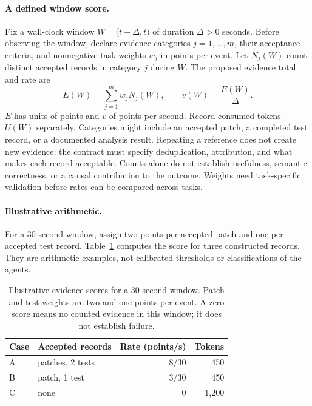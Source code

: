 \documentclass[11pt,a4paper]{article}
\theoremstyle{definition}
\theoremstyle{remark}
\begin{document}
\paragraph{A defined window score.}
Fix a wall-clock window $W=[t-\Delta,t)$ of duration $\Delta>0$ seconds.
Before observing the window, declare evidence categories $j=1,\ldots,m$, their
acceptance criteria, and nonnegative task weights $w_j$ in points per event.
Let $N_j(W)$ count distinct accepted records in category $j$ during $W$.
The proposed evidence total and rate are
\[
 E(W)=\sum_{j=1}^{m}w_jN_j(W),\qquad
 v(W)=\frac{E(W)}{\Delta}.
\]
$E$ has units of points and $v$ of points per second. Record consumed tokens
$U(W)$ separately. Categories might include an accepted patch, a completed test
record, or a documented analysis result. Repeating a reference does not create
new evidence; the contract must specify deduplication, attribution, and what
makes each record acceptable. Counts alone do not establish usefulness, semantic
correctness, or a causal contribution to the outcome. Weights need task-specific
validation before rates can be compared across tasks.

\paragraph{Illustrative arithmetic.}
For a 30-second window, assign two points per accepted patch and one per
accepted test record. Table~\ref{tab:cadence-verdicts} computes the score for
three constructed records. They are arithmetic examples, not calibrated
thresholds or classifications of the agents.

\begin{table}[H]
\centering
\caption{Illustrative evidence scores for a 30-second window. Patch and test
weights are two and one points per event. A zero score means no counted evidence
in this window; it does not establish failure.}
\label{tab:cadence-verdicts}
\begin{tabularx}{\textwidth}{@{}l >{\raggedright\arraybackslash}X r r@{}}
\toprule
\textbf{Case} & \textbf{Accepted records} & \textbf{Rate (points/s)} & \textbf{Tokens} \\
\midrule
A & 3 patches, 2 tests & $8/30$ & 450 \\
B & 1 patch, 1 test & $3/30$ & 450 \\
C & none & $0$ & 1,200 \\
\bottomrule
\end{tabularx}
\end{table}
\end{document}

